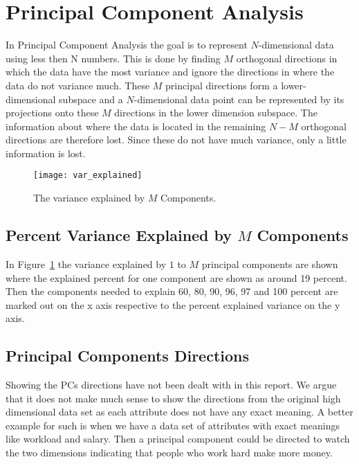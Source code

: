 \section{Principal Component Analysis}

In Principal Component Analysis the goal is to represent $N$-dimensional data using less then N numbers. This is done by finding $M$ orthogonal directions in which the data have the most variance and ignore the directions in where the data do not variance much. These $M$ principal directions form a lower-dimensional subspace and a $N$-dimensional data point can be represented by its projections onto these $M$ directions in the lower dimension subspace. The information about where the data is located in the remaining $N-M$ orthogonal directions are therefore lost. Since these do not have much variance, only a little information is lost.

\begin{figure}[H]
\centering
\texttt{[image: var\_explained]}
\caption{The variance explained by $M$ Components.\label{fig:pca_var_explained}}
\end{figure}

\subsection{Percent Variance Explained by $M$ Components}

In Figure~\ref{fig:pca_var_explained} the variance explained by $1$ to $M$ principal components are shown where the explained percent for one component are shown as around 19 percent. Then the components needed to explain 60, 80, 90, 96, 97 and 100 percent are marked out on the x axis respective to the percent explained variance on the y axis.

\subsection{Principal Components Directions}
Showing the PCs directions have not been dealt with in this report. We argue that it does not make much sense to show the directions from the original high dimensional data set as each attribute does not have any exact meaning. A better example for such is when we have a data set of attributes with exact meanings like workload and salary. Then a principal component could be directed to watch the two dimensions indicating that people who work hard make more money.


